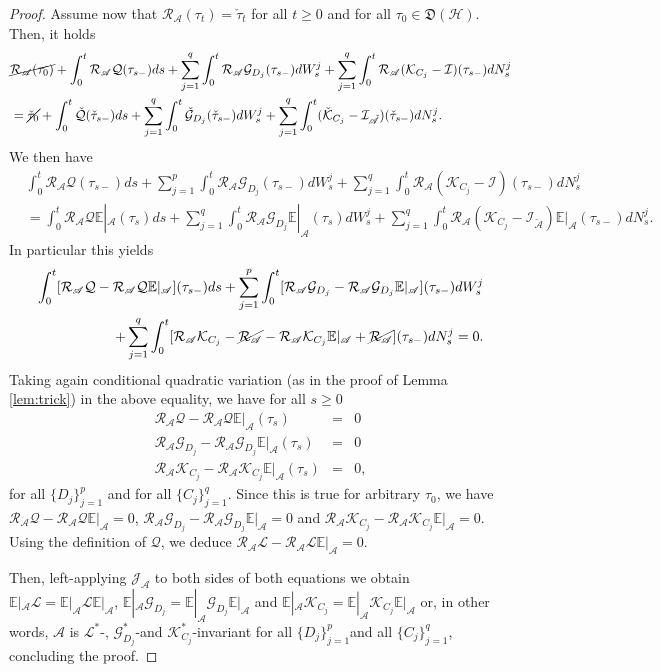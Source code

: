\documentclass[aihp,12pt]{imsart}
\newcommand{\Gc}{\mathcal{G}}
\newcommand{\Hc}{\mathcal{H}}
\newcommand{\Jc}{\mathcal{J}}
\newcommand{\Rc}{\mathcal{R}}
\newcommand{\Qc}{\mathcal{Q}}
\newcommand{\Ic}{\mathcal{I}}
\newcommand{\Kc}{\mathcal{K}}
\newcommand{\Lc}{\mathcal{L}}
\newcommand{\As}{\mathscr{A}}
\newcommand{\Df}{\mathfrak{D}}
\newcommand{\CE}{\mathbb{E}|}
\theoremstyle{theorem}
\theoremstyle{definition}
\theoremstyle{remark}
\begin{document}
\begin{proof}
    Assume now that $\Rc_\As(\tau_t) = \check{\tau}_t$ for all $t\geq0$ and for all $\tau_0\in\Df(\Hc)$. Then, it holds 
    \begin{align*}
    &\cancel{\Rc_\As(\tau_0)} + \int_0^t \Rc_\As\Qc(\tau_{s-}) ds + \sum_{j=1}^q \int_0^t \Rc_\As\Gc_{D_j}(\tau_{s-}) dW_s^j+\sum_{j=1}^q \int_{0}^t \Rc_\As(\Kc_{C_j}-\Ic)(\tau_{s-}) dN_s^j \\&= \cancel{\check{\tau}_0} + \int_0^t {\check{\Qc}}(\check{\tau}_{s-}) ds + \sum_{j=1}^q \int_0^t {\check{\Gc}_{D_j}}(\check{\tau}_{s-})dW_s^j +\sum_{j=1}^q \int_{0}^t (\check{\Kc}_{C_j}-\Ic_{\check{\As}})(\check{\tau}_{s-}) dN_s^j.
    \end{align*}
    We then have
     \begin{align*}
         &\int_0^t \Rc_\As\Qc(\tau_{s-}) ds + \sum_{j=1}^p \int_0^t \Rc_\As\Gc_{D_j}(\tau_{s-}) dW_s^j +\sum_{j=1}^q \int_{0}^t \Rc_\As(\Kc_{C_j}-\Ic)(\tau_{s-}) dN_s^j\\ &= \int_0^t \Rc_\As{{\Qc}}\CE_\As({\tau}_s) ds + \sum_{j=1}^q \int_0^t \Rc_\As{{\Gc}_{D_j}}\CE_\As({\tau}_s) dW_s^j +\sum_{j=1}^q \int_{0}^t \Rc_\As(\Kc_{C_j}-\Ic_{\check{\As}})\CE_\As(\tau_{s-}) dN_s^j .
     \end{align*}
    In particular this yields
    \begin{align*}
        \int_0^t [\Rc_\As\Qc -\Rc_\As{{\Qc}}\CE_\As](\tau_{s-}) ds + \sum_{j=1}^p \int_0^t [\Rc_\As\Gc_{D_j}-\Rc_\As{{\Gc}_{D_j}}\CE_\As](\tau_{s-}) dW_s^j \\+ \sum_{j=1}^q \int_{0}^t [\Rc_\As\Kc_{C_j}-\cancel{\Rc_\As} - \Rc_\As\Kc_{C_j}\CE_\As + \cancel{\Rc_\As}](\tau_{s-}) dN_s^j = 0. 
    \end{align*}
    Taking again conditional quadratic variation  (as in the proof of Lemma \ref{lem:trick}) in the above equality, we have for all $s\geq0$
    \begin{eqnarray*}
     \Rc_\As\Qc -\Rc_\As{{\Qc}}\CE_\As(\tau_{s}) &=& 0 \\
     \Rc_\As\Gc_{D_j}-\Rc_\As{{\Gc}_{D_j}}\CE_\As(\tau_{s})&=&0\\
     \Rc_\As\Kc_{C_j} - \Rc_\As\Kc_{C_j}\CE_\As  (\tau_{s})&=&0,
    \end{eqnarray*}
    for all $\{D_j\}_{j=1}^p$ and for all $\{C_j\}_{j=1}^q$. Since this is true for arbitrary $\tau_0$, we have $\Rc_\As\Qc -\Rc_\As{{\Qc}}\CE_\As = 0$, $\Rc_\As\Gc_{D_j}-\Rc_\As{{\Gc}_{D_j}}\CE_\As=0$ and $\Rc_\As\Kc_{C_j} - \Rc_\As\Kc_{C_j}\CE_\As  =0$. Using the definition of $\Qc$, we deduce $\Rc_\As\Lc -\Rc_\As{{\Lc}}\CE_\As = 0$.
 
 Then, left-applying $\Jc_\As$ to both sides of both equations we obtain $\CE_\As\Lc =\CE_\As{{\Lc}}\CE_\As$, $\CE_\As\Gc_{D_j}=\CE_\As{{\Gc}_{D_j}}\CE_\As$ and $\CE_\As\Kc_{C_j} = \CE_\As\Kc_{C_j}\CE_\As$ or, in other words, $\As$ is $\Lc^*$-, $\Gc_{D_j}^*$-and $\Kc_{C_j}^*$-invariant for all $\{D_j\}_{j=1}^p$and all $\{C_j\}_{j=1}^q$, concluding the proof.
\end{proof}
\end{document}

